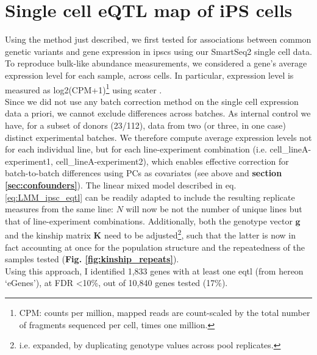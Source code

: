 \section{Single cell eQTL map of iPS cells}
\label{sec:sc_ipsc_eqtl}

Using the method just described, we first tested for associations between common genetic variants and gene expression in \glspl{ipsc} using our SmartSeq2 single cell data.
To reproduce bulk-like abundance measurements, we considered a gene's average expression level for each sample, across cells.
In particular, expression level is measured as log2(CPM+1)\footnote{CPM: counts per million, mapped reads are count-scaled by the total number of fragments sequenced per cell, times one million.} using scater \cite{mccarthy2017scater}.
\\

Since we did not use any batch correction method on the single cell expression data a priori, we cannot exclude differences across batches.
As internal control we have, for a subset of donors (23/112), data from two (or three, in one case) distinct experimental batches.
We therefore compute average expression levels not for each individual line, but for each line-experiment combination (i.e. cell\_lineA-experiment1, cell\_lineA-experiment2), which enables effective correction for batch-to-batch differences using PCs as covariates (see above and \textbf{section \ref{sec:confounders}}).
The linear mixed model described in eq. \eqref{eq:LMM_ipsc_eqtl} can be readily adapted to include the resulting replicate measures from the same line: $N$ will now be not the number of unique lines but that of line-experiment combinations.
Additionally, both the genotype vector $\mathbf{g}$ and the kinship matrix $\mathbf{K}$ need to be adjusted\footnote{i.e. expanded, by duplicating genotype values across pool replicates.}, such that the latter is now in fact accounting at once for the population structure and the repeatedness of the samples tested (\textbf{Fig. \ref{fig:kinship_repeats}}). \\

Using this approach, I identified 1,833 genes with at least one \gls{eqtl} (from hereon `eGenes'), at FDR <10\%, out of 10,840 genes tested (17\%). 


